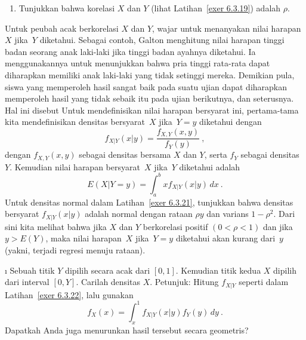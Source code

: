 {\begin{LJSItem}
\begin{enumerate}
\item Tunjukkan bahwa korelasi $X$ dan $Y$ (lihat Latihan~\ref{exer 6.3.19}) adalah
$\rho$.
\end{enumerate}

\istar\label{exer 6.3.22} Untuk peubah acak berkorelasi $X$ dan $Y$, wajar untuk
menanyakan nilai harapan~$X$ jika~$Y$ diketahui. Sebagai contoh,
Galton menghitung nilai harapan tinggi badan seorang anak laki-laki
jika tinggi badan ayahnya diketahui. Ia menggunakannya untuk menunjukkan bahwa pria
tinggi rata-rata dapat diharapkan memiliki anak laki-laki yang tidak setinggi mereka.
Demikian pula, siswa yang memperoleh hasil sangat baik pada suatu ujian dapat
diharapkan memperoleh hasil yang tidak sebaik itu pada ujian berikutnya, dan
seterusnya. Hal ini disebut 
Untuk mendefinisikan nilai harapan bersyarat ini, pertama-tama kita mendefinisikan
densitas bersyarat~$X$ jika~$Y = y$ diketahui dengan
$$ f_{X|Y}(x|y) = \frac {f_{X,Y}(x,y)}{f_Y(y)}\ ,
$$ dengan $f_{X,Y}(x,y)$ sebagai densitas bersama $X$ dan $Y$, serta $f_Y$ sebagai
densitas $Y$. Kemudian nilai harapan bersyarat~$X$ jika~$Y$ diketahui adalah
$$ E(X|Y = y) = \int_a^b x f_{X|Y}(x|y)\, dx\ .
$$ Untuk densitas normal dalam Latihan~\ref{exer 6.3.21}, tunjukkan bahwa densitas
bersyarat $f_{X|Y}(x|y)$ adalah normal dengan rataan $\rho y$ dan varians $1 - \rho^2$.
Dari sini kita melihat bahwa jika $X$ dan $Y$ berkorelasi positif $(0 < \rho < 1)$ dan
jika $y > E(Y)$, maka nilai harapan~$X$ jika~$Y = y$ diketahui akan kurang dari~$y$
(yakni, terjadi regresi menuju rataan).

\i\label{exer 6.3.23} Sebuah titik $Y$ dipilih secara acak dari $[0,1]$. Kemudian
titik kedua $X$ dipilih dari interval $[0,Y]$. Carilah densitas $X$. \emx
{Petunjuk}: Hitung $f_{X|Y}$ seperti dalam Latihan~\ref{exer 6.3.22}, lalu gunakan
$$ f_X(x) = \int_x^1 f_{X|Y}(x|y) f_Y(y)\, dy\ .
$$ Dapatkah Anda juga menurunkan hasil tersebut secara geometris?



\end{LJSItem}}

